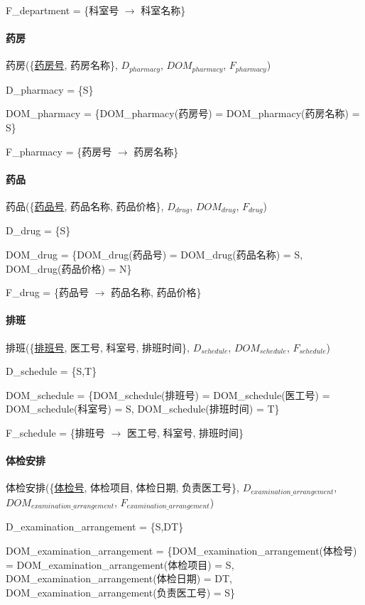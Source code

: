 \documentclass{article}
\begin{document}
F\_department = \{科室号 $\rightarrow$ 科室名称\}

\paragraph{药房}

药房(\{\underline{药房号}, 药房名称\}, $D_{pharmacy}$, $DOM_{pharmacy}$, $F_{pharmacy}$)

D\_pharmacy = \{S\}

DOM\_pharmacy = \{DOM\_pharmacy(药房号) = DOM\_pharmacy(药房名称) = S\}

F\_pharmacy = \{药房号 $\rightarrow$ 药房名称\}

\paragraph{药品}

药品(\{\underline{药品号}, 药品名称,  药品价格\}, $D_{drug}$, $DOM_{drug}$, $F_{drug}$)

D\_drug = \{S\}

DOM\_drug = \{DOM\_drug(药品号) = DOM\_drug(药品名称) = S, DOM\_drug(药品价格) = N\}

F\_drug = \{药品号 $\rightarrow$ 药品名称, 药品价格\}

\paragraph{排班}

排班(\{\underline{排班号}, 医工号, 科室号, 排班时间\}, $D_{schedule}$, $DOM_{schedule}$, $F_{schedule}$)

D\_schedule = \{S,T\}

DOM\_schedule = \{DOM\_schedule(排班号) = DOM\_schedule(医工号) = DOM\_schedule(科室号) = S, DOM\_schedule(排班时间) = T\}

F\_schedule = \{排班号 $\rightarrow$ 医工号, 科室号, 排班时间\}

\paragraph{体检安排}

体检安排(\{\underline{体检号}, 体检项目, 体检日期, 负责医工号\}, $D_{examination\_arrangement}$, \newline$DOM_{examination\_arrangement}$, $F_{examination\_arrangement}$)

D\_examination\_arrangement = \{S,DT\}

DOM\_examination\_arrangement = \{DOM\_examination\_arrangement(体检号) = \newline DOM\_examination\_arrangement(体检项目) = S, \newline DOM\_examination\_arrangement(体检日期) = DT, DOM\_examination\_arrangement(负责医工号) = S\}
\end{document}
